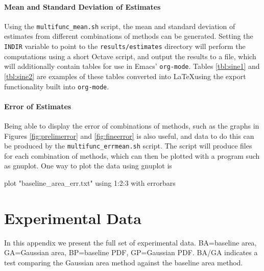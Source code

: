\documentclass[a4paper,11pt]{article}
\begin{document}
\begin{appendices}
\paragraph{Mean and Standard Deviation of Estimates} Using the \texttt{multifunc\_mean.sh} script, the mean
and standard deviation of estimates from different combinations of methods can
be generated. Setting the \texttt{INDIR} variable to point to the
\texttt{results/estimates} directory will perform the computations using a short
Octave script, and output the results to a file, which will additionally contain
tables for use in Emacs' \texttt{org-mode}. Tables \ref{tbl:sine1} and
\ref{tbl:sine2} are examples of these tables converted into \LaTeX using the
export functionality built into \texttt{org-mode}.

\paragraph{Error of Estimates}
Being able to display the error of combinations of methods, such as the graphs
in Figures \ref{fig:prelimerror} and \ref{fig:fineerror} is also useful, and
data to do this can be produced by the \texttt{multifunc\_errmean.sh}
script. The script will produce files for each combination of methods, which can
then be plotted with a program such as gnuplot. One way to plot the data using
gnuplot is
\small
\begin{verbatimtab}
plot "baseline_area_err.txt" using 1:2:3 with errorbars
\end{verbatimtab}
\normalsize
\section{Experimental Data}
\label{sec-11}

In this appendix we present the full set of experimental data. BA=baseline area,
GA=Gaussian area, BP=baseline PDF, GP=Gaussian PDF. BA/GA indicates a test
comparing the Gaussian area method against the baseline area method.

\begin{table}[htb]


\end{table}
\end{appendices}
\end{document}

